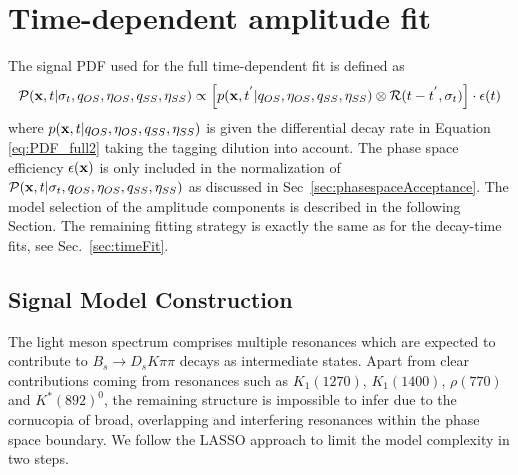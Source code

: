 \section{Time-dependent amplitude fit}
\label{sec:fullFit}

The signal PDF used for the full time-dependent fit is defined as
\begin{equation}
\label{eq:ampPDF_full}
\mathcal{P}(\mathbf{x}, t \vert\sigma_t, q_{OS}, \eta_{OS}, q_{SS}, \eta_{SS}) \propto \left[ p(\mathbf{x}, t^{'} \vert q_{OS}, \eta_{OS}, q_{SS}, \eta_{SS})  \otimes \mathcal{R}(t - t^{'},\sigma_t) \right] \cdot \epsilon(t)
\end{equation}
where $p(\mathbf{x}, t \vert q_{OS}, \eta_{OS}, q_{SS}, \eta_{SS})$ is given the differential decay rate in Equation \ref{eq:PDF_full2} taking the tagging dilution into account.
The phase space efficiency $\epsilon(\mathbf{x})$ is only included in the normalization of $\mathcal{P}(\mathbf{x}, t \vert\sigma_t, q_{OS}, \eta_{OS}, q_{SS}, \eta_{SS})$
as discussed in Sec~\ref{sec:phasespaceAcceptance}. 
The model selection of the amplitude components is described in the following Section.
The remaining fitting strategy is exactly the same as for the decay-time fits, see Sec.~\ref{sec:timeFit}.

\subsection{Signal Model Construction}
\label{sec:LASSO}

The light meson spectrum comprises multiple resonances which are expected to contribute to $B_s \to D_s K \pi \pi$  decays as intermediate states. 
Apart from clear contributions coming from resonances such as $K_{1}(1270)$, $K_{1}(1400)$, $\rho(770)$ and $K^*(892)^0$, 
the remaining structure is impossible to infer due to
the cornucopia of broad, overlapping and interfering resonances 
within the phase space boundary.
We follow the \textsf{LASSO} \cite{Tibshirani94regressionshrinkage,Guegan:2015mea} approach 
to limit the model complexity in two steps.

